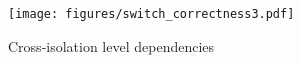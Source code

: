 

\begin{figure}[t]
    \centering
    \texttt{[image: figures/switch\_correctness3.pdf]}
    \vspace{-4mm}
    \caption{Cross-isolation level dependencies}
    \label{fig:switch_correctness}
    \vspace{-4mm}
\end{figure}

